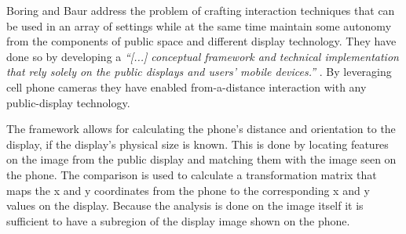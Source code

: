 Boring and Baur address the problem of crafting interaction techniques that can be used in an array of settings while at the same time maintain some autonomy from the components of public space and different display technology. %
They have done so by developing a \emph{``[...] conceptual framework and technical implementation that rely solely on the public displays and users' mobile devices.''} \cite{Boring:2013}. By  leveraging cell phone cameras they have enabled from-a-distance interaction with any public-display technology.
%

The framework allows for calculating the phone's distance and orientation to the display, if the display's physical size is known.
This is done by locating features on the image from the public display and matching them with the image seen on the phone. The comparison is used to calculate a transformation matrix that maps the x and y coordinates from the phone to the corresponding x and y values on the display. Because the analysis is done on the image itself  it is sufficient to have a subregion of the display image shown on the phone.

